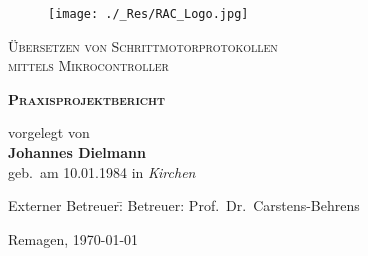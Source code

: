 \documentclass[11pt]{article}
\begin{document}
\begin{titlepage}
\author{}
\begin{figure}[hp]
	\centering
	\texttt{[image: ./\_Res/RAC\_Logo.jpg]}
\end{figure}
\begin{center}
\huge
\textsc{Übersetzen von Schrittmotorprotokollen\\ mittels Mikrocontroller}\\

\vspace{2cm}

\LARGE
\textsc{\bf Praxisprojektbericht\\[0.5\baselineskip]
\Large {}}

\large
\vspace{2cm}
\textnormal{vorgelegt von\\[0.5\baselineskip]\textbf{Johannes Dielmann}\\[0.5\baselineskip] geb.\ am 10.01.1984 in {\em Kirchen} }\\ 
\vspace{1cm}


\end{center}

\normalsize
\begin{flushleft}	

\vspace{15mm}
\begin{tabbing}
Externer Betreuer:\quad\=\kill
Betreuer: \> Prof.\ Dr.\ Carstens-Behrens\\[1\baselineskip]

\end{tabbing}
\end{flushleft}


\vspace{4cm}

\begin{center}
\textnormal{Remagen, \today}
\end{center}


\end{titlepage}

\tableofcontents 	\newpage
\listoffigures 		\newpage
\listoftables		\newpage
\newpage
\end{document}
